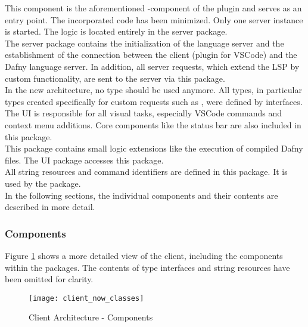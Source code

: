 {\bf {}} \textendash{}
This component is the aforementioned -component of the plugin and serves as an entry point.
The incorporated code has been minimized.
Only one server instance is started.
The logic is located entirely in the server package.\\

{\bf {}} \textendash{}
The server package contains the initialization of the language server and the establishment of the connection between the client (plugin for VSCode) and the Dafny language server.
In addition, all server requests, which extend the LSP by custom functionality, are sent to the server via this package.\\

{\bf {}} \textendash{}
In the new architecture, no  type should be used anymore.
All types, in particular types created specifically for custom requests such as , were defined by interfaces. \\

{\bf {}} \textendash{}
The UI is responsible for all visual tasks, especially VSCode commands and context menu additions.
Core components like the status bar are also included in this package.\\

{\bf {}} \textendash{}
This package contains small logic extensions like the execution of compiled Dafny files.
The UI package accesses this package.\\

{\bf {}} \textendash{}
All string resources and command identifiers are defined in this package.
It is used by the  package. \\

In the following sections, the individual components and their contents are described in more detail.

\subsubsection{Components}
Figure \ref{fig:client_now_classes} shows a more detailed view of the client, including the components within the packages.
The contents of type interfaces and string resources have been omitted for clarity.\\

\begin{figure}[H]
    \centering
    \texttt{[image: client\_now\_classes]}
    \caption{Client Architecture - Components}
    \label{fig:client_now_classes}
\end{figure}

